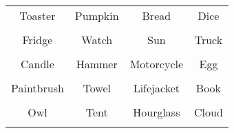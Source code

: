 \documentclass[12pt,a4paper]{article}
\begin{document}
\thispagestyle{empty}
\begin{table}[]
\centering
\Huge
\begin{tabular}{cccc}
 Toaster& Pumpkin& Bread& Dice\\  & & & \\
 Fridge& Watch& Sun& Truck\\  & & & \\
 Candle& Hammer& Motorcycle& Egg\\  & & & \\
 Paintbrush& Towel& Lifejacket& Book\\  & & & \\
 Owl& Tent& Hourglass& Cloud\\  & & & \\
\end{tabular}
\end{table}
\end{document}
